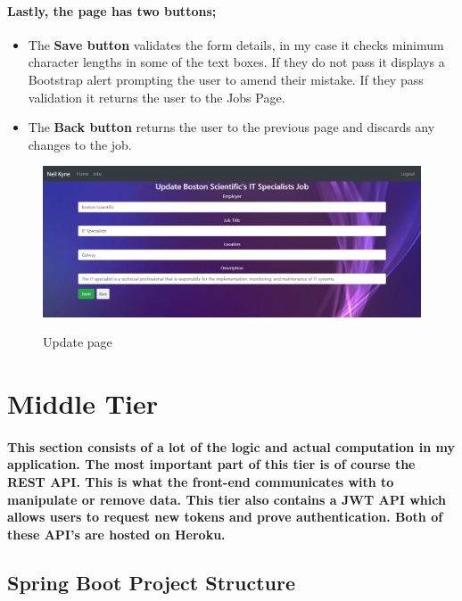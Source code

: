 \paragraph{Lastly, the page has two buttons;}
\begin{itemize}
    \item The \textbf{Save button} validates the form details, in my case it checks minimum character lengths in some of the text boxes. If they do not pass it displays a Bootstrap alert prompting the user to amend their mistake. If they pass validation it returns the user to the Jobs Page.
    \item The \textbf{Back button} returns the user to the previous page and discards any changes to the job.
\end{itemize}
\begin{figure}[ht]
    \centering
    \includegraphics[scale=0.3]{Images/update.png} 
    \label{update_label}
    \caption{Update page}
\end{figure}

\section{Middle Tier}
\paragraph{This section consists of a lot of the logic and actual computation in my application. The most important part of this tier is of course the REST API. This is what the front-end communicates with to manipulate or remove data. This tier also contains a JWT API which allows users to request new tokens and prove authentication. Both of these API's are hosted on Heroku.}
\newpage
\subsection{Spring Boot Project Structure}
